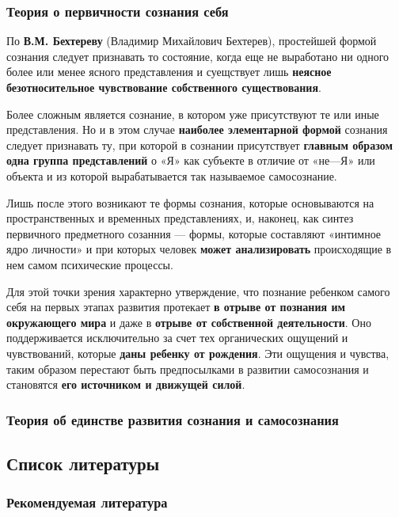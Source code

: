 \documentclass{article}
\begin{document}
\subsubsection{Теория о первичности сознания себя}

\begin{flushleft}

По \textbf{В.М. Бехтереву} (Владимир Михайлович Бехтерев), простейшей формой сознания следует признавать то состояние, когда еще не выработано ни одного более или менее ясного представления и суещствует лишь \textbf{неясное безотносительное чувствование собственного существования}.

Более сложным является сознание, в котором уже присутствуют те или иные представления. Но и в этом случае \textbf{наиболее элементарной формой} сознания следует признавать ту, при которой в сознании присутствует \textbf{главным образом одна группа представлений} о «Я» как субъекте в отличие от «не—Я» или объекта и из которой вырабатывается так называемое самосознание.

Лишь после этого возникают те формы сознания, которые основываются на пространственных и временных представлениях, и, наконец, как синтез первичного предметного созанния — формы, которые составляют «интимное ядро личности» и при которых человек \textbf{может анализировать} происходящие в нем самом психические процессы.

Для этой точки зрения характерно утверждение, что познание ребенком самого себя на первых этапах развития протекает \textbf{в отрыве от познания им окружающего мира} и даже в \textbf{отрыве от собственной деятельности}. Оно поддерживается исключительно за счет тех органических ощущений и чувствований, которые \textbf{даны ребенку от рождения}. Эти ощущения и чувства, таким образом перестают быть предпосылками в развитии самосознания и становятся \textbf{его источником и движущей силой}.

\end{flushleft}

\subsubsection{Теория об единстве развития сознания и самосознания}

\subsection{Список литературы}

\subsubsection{Рекомендуемая литература}
\end{document}
